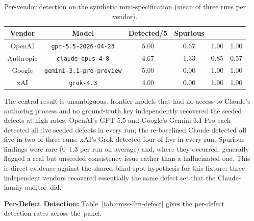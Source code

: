 \documentclass[software,article,accept,pdftex,oneauthor]{Definitions/mdpi}
\def\hl#1{#1}
\begin{document}
\begin{table}[H]
\caption{Per-vendor detection on the synthetic mini-specification (mean of three runs per vendor).}
\label{tab:cross-llm-vendor}
\begin{tabularx}{\textwidth}{cCcccc}
\toprule
\textbf{Vendor} & \textbf{Model} & \textbf{Detected/5} & \textbf{Spurious} & \textbf{} & \textbf{} \\
\midrule
OpenAI    & \texttt{\hl{gpt-5.5-2026-04-23}}     & 5.00 & 0.67 & 1.00 & 1.00 \\
Anthropic & \texttt{\hl{claude-opus-4-8}}         & 4.67 & 1.33 & 0.85 & 0.57 \\
Google    & \texttt{\hl{gemini-3.1-pro-preview}}  & 5.00 & 0.00 & 1.00 & 1.00 \\
xAI       & \texttt{\hl{grok-4.3}}                & 4.00 & 0.00 & 1.00 & 1.00 \\
\bottomrule
\end{tabularx}
\end{table}






\vspace{-3pt}

The central result is unambiguous: frontier models that had no access to Claude's authoring process and no ground-truth key independently recovered the seeded defects at high rates. OpenAI's GPT-5.5 and Google's Gemini 3.1 Pro each detected all five seeded defects in every run; the re-baselined Claude detected all five in two of three runs; xAI's Grok detected four of five in every run. Spurious findings were rare (0--1.3 per run on average) and, where they occurred, generally flagged a real but unseeded consistency issue rather than a hallucinated one. This is direct evidence against the shared-blind-spot hypothesis for this fixture: three independent vendors recovered essentially the same defect set that the Claude-family auditor~did.

\textbf{\hl{Per-Defect Detection:}} Table~\ref{tab:cross-llm-defect} gives the per-defect detection rates across the~panel.
\end{document}

